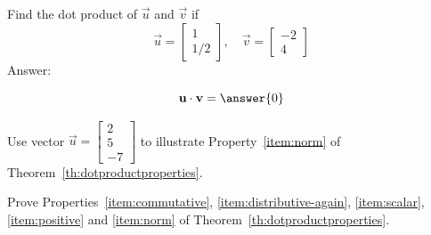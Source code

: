 \documentclass{ximera}
\begin{document}
\begin{problem}\label{prob:dotproduct2}
Find the dot product of $\vec{u}$ and $\vec{v}$ if 
  $$\vec{u}=\begin{bmatrix}1\\1/2\end{bmatrix},\quad \vec{v}=\begin{bmatrix}-2\\4\end{bmatrix}$$
  Answer:
  
  $$\vec{u} \dotp \vec{v} = \answer{0}$$
\end{problem}

\begin{problem}\label{prob:dotproductprop6}
  Use vector $\vec{u}=\begin{bmatrix}2\\5\\-7\end{bmatrix}$ to
  illustrate Property~\ref{item:norm} of Theorem~\ref{th:dotproductproperties}.
\end{problem}

\begin{problem}\label{prob:th:dotprductproperties}
  Prove Properties~\ref{item:commutative}, \ref{item:distributive-again}, \ref{item:scalar}, \ref{item:positive} and \ref{item:norm} of Theorem~\ref{th:dotproductproperties}.
\end{problem}
\end{document}
